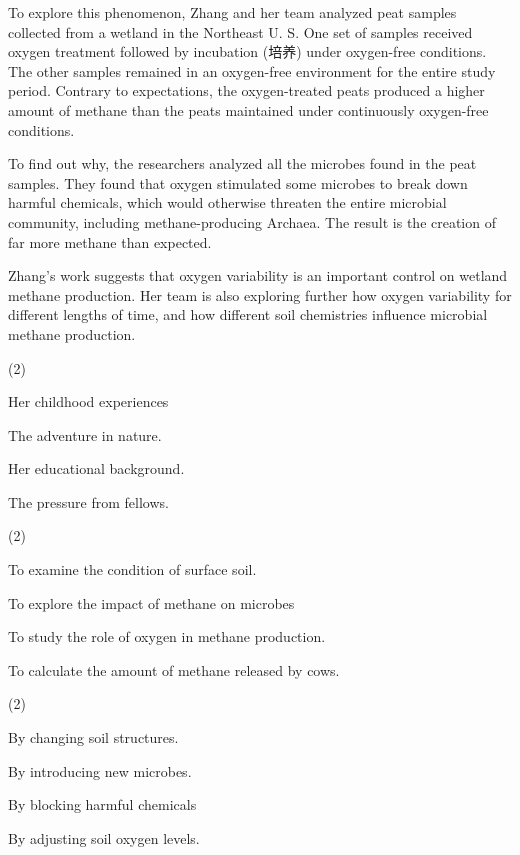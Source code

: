 \documentclass{英语试卷}
\begin{document}
\par To explore this phenomenon, Zhang and her team analyzed peat samples collected from a wetland in the Northeast U. S. One set of samples received oxygen treatment followed by incubation (培养) under oxygen-free conditions. The other samples remained in an oxygen-free environment for the entire study period. Contrary to expectations, the oxygen-treated peats produced a higher amount of methane than the peats maintained under continuously oxygen-free conditions.\par
\par To find out why, the researchers analyzed all the microbes found in the peat samples. They found that oxygen stimulated some microbes to break down harmful chemicals, which would otherwise threaten the entire microbial community, including methane-producing Archaea. The result is the creation of far more methane than expected.\par
\par Zhang's work suggests that oxygen variability is an important control on wetland methane production. Her team is also exploring further how oxygen variability for different lengths of time, and how different soil chemistries influence microbial methane production.\par
{}
\begin{choices}(2)
  \item Her childhood experiences
  \item The adventure in nature.
  \item Her educational background.
  \item The pressure from fellows.
\end{choices}
\begin{choices}(2)
  \item To examine the condition of surface soil.
  \item To explore the impact of methane on microbes
  \item To study the role of oxygen in methane production.
  \item To calculate the amount of methane released by cows.
\end{choices}
\begin{choices}(2)
  \item By changing soil structures.
  \item By introducing new microbes.
  \item By blocking harmful chemicals
  \item By adjusting soil oxygen levels.
\end{choices}
\end{document}
